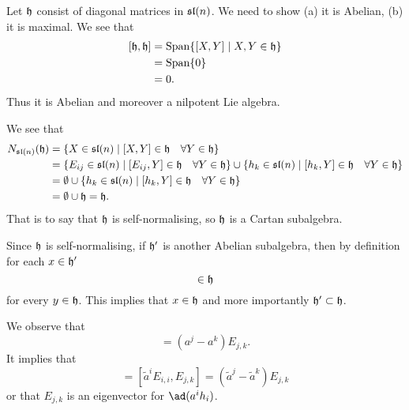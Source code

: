 Let $\frak{h}$ consist of diagonal matrices in $\frak{sl}(n)$. We
need to show (a) it is Abelian, (b) it is maximal. We see that
\begin{subequations}
\begin{align}
[\frak{h},\frak{h}] &= \mathop{\rm Span}\nolimits\{[X,Y]\mid X,Y\in\frak{h}\}\\
&= \mathop{\rm Span}\nolimits\{0\}\\
&=0.
\end{align}
\end{subequations}
Thus it is Abelian and moreover a nilpotent Lie algebra.

We see that
\begin{subequations}
\begin{align}
N_{\frak{sl}(n)}(\frak{h}) &= \{X\in\frak{sl}(n)\mid
[X,Y]\in\frak{h}\quad\forall Y\in\frak{h}\}\\
&=\{ E_{ij}\in\frak{sl}(n)\mid
[E_{ij},Y]\in\frak{h}\quad\forall Y\in\frak{h}\}\cup\{ h_{k}\in\frak{sl}(n)\mid
[h_{k},Y]\in\frak{h}\quad\forall Y\in\frak{h}\}\\
&=\emptyset\cup\{ h_{k}\in\frak{sl}(n)\mid
[h_{k},Y]\in\frak{h}\quad\forall Y\in\frak{h}\}\\
&=\emptyset\cup\frak{h}=\frak{h}.
\end{align}
\end{subequations}
That is to say that $\frak{h}$ is self-normalising, so $\frak{h}$
is a Cartan subalgebra.

Since $\frak{h}$ is self-normalising, if $\frak{h}'$ is another
Abelian subalgebra, then by definition for each $x\in\frak{h}'$
\begin{equation}
[x,y]\in\frak{h}
\end{equation}
for every $y\in\frak{h}$. This implies that $x\in\frak{h}$ and
more importantly $\frak{h'}\subset\frak{h}$.

We observe that
\begin{equation}
[a^{i}E_{i,i},E_{j,k}]=(a^{j}-a^{k})E_{j,k}.
\end{equation}
It implies that
\begin{equation}
[a^{i}h_{i},E_{j,k}]=[\widetilde{a}^{i}E_{i,i},E_{j,k}]=(\widetilde{a}^{j}-\widetilde{a}^{k})E_{j,k}
\end{equation}
or that $E_{j,k}$ is an eigenvector for $\ad(a^{i}h_{i})$.

